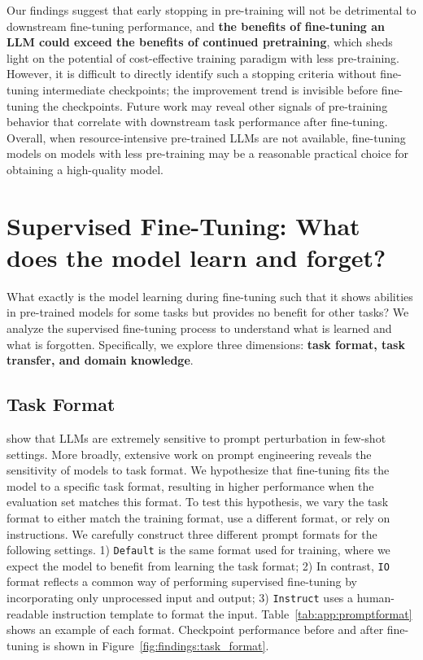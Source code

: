 Our findings suggest that early stopping in pre-training will not be detrimental to downstream fine-tuning performance, and \textbf{the benefits of fine-tuning an LLM could exceed the benefits of continued pretraining}, which sheds light on the potential of cost-effective training paradigm with less pre-training.
However, it is difficult to directly identify such a stopping criteria without fine-tuning intermediate checkpoints; the improvement trend is invisible before fine-tuning the checkpoints.
Future work may reveal other signals of pre-training behavior that correlate with downstream task performance after fine-tuning.
Overall, when resource-intensive pre-trained LLMs are not available, fine-tuning models on models with less pre-training may be a reasonable practical choice for obtaining a high-quality model.


\section{Supervised Fine-Tuning: What does the model learn and forget?}
\label{sec:finding:what}
What exactly is the model learning during fine-tuning such that it shows abilities in pre-trained models for some tasks but provides no benefit for other tasks?
We analyze the supervised fine-tuning process to understand what is learned and what is forgotten. 
Specifically, we explore three dimensions: \textbf{task format, task transfer, and domain knowledge}.



\subsection{Task Format}
\citealp{sclar2023quantifying} show that LLMs are extremely sensitive to prompt perturbation in few-shot settings. 
More broadly, extensive work on prompt engineering reveals the sensitivity of models to task format.
We hypothesize that fine-tuning fits the model to a specific task format, resulting in higher performance when the evaluation set matches this format. 
To test this hypothesis, we vary the task format to either match the training format, use a different format, or rely on instructions. 
We carefully construct three different prompt formats for the following settings. 1) 
\texttt{Default} is the same format used for training, where we expect the model to benefit from learning the task format;
2) In contrast, \texttt{IO} format reflects a common way of performing supervised fine-tuning by incorporating only unprocessed input and output;
3) \texttt{Instruct} uses a human-readable instruction template to format the input.
Table~\ref{tab:app:promptformat} shows an example of each format.
Checkpoint performance before and after fine-tuning is shown in Figure~\ref{fig:findings:task_format}.

